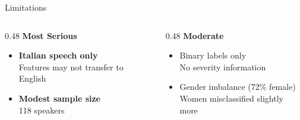 \documentclass[aspectratio=169,11pt]{beamer}
\begin{document}
\begin{frame}{Limitations}
    \begin{columns}[T]
        \begin{column}{0.48\textwidth}
            \textbf{\color{warningorange}\faExclamationTriangle\hspace{0.3em} Most Serious}
            
            \vspace{0.3cm}
            
            \begin{itemize}
                \item \textbf{Italian speech only}\\
                      \small\color{darkgrey} Features may not transfer to English
                      
                \vspace{0.2cm}
                      
                \item \normalsize\color{black}\textbf{Modest sample size}\\
                      \small\color{darkgrey} 118 speakers
            \end{itemize}
        \end{column}
        
        \begin{column}{0.48\textwidth}
            \textbf{\color{darkgrey}\faInfoCircle\hspace{0.3em} Moderate}
            
            \vspace{0.3cm}
            
            \begin{itemize}
                \item Binary labels only\\
                      \small\color{darkgrey} No severity information
                      
                \vspace{0.2cm}
                      
                \item \normalsize\color{black}Gender imbalance (72\% female)\\
                      \small\color{darkgrey} Women misclassified slightly more
            \end{itemize}
        \end{column}
    \end{columns}
    

\end{frame}
\end{document}
